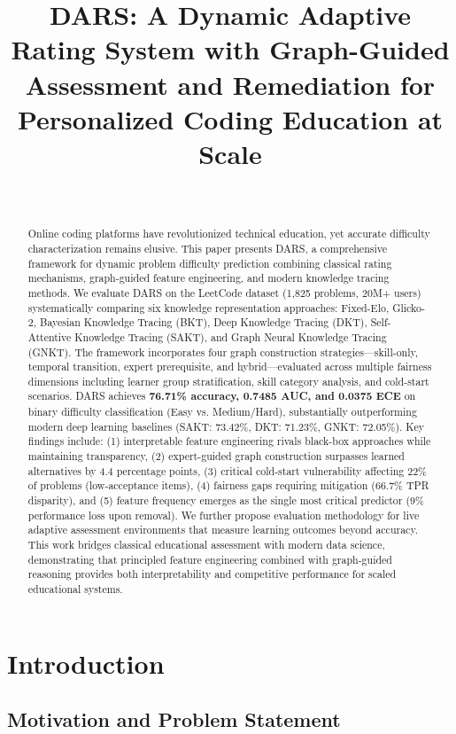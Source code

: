 \documentclass[conference]{IEEEtran}
\title{DARS: A Dynamic Adaptive Rating System with Graph-Guided Assessment and Remediation for Personalized Coding Education at Scale}
\author{\IEEEauthorblockN{Khethavath Sunil Naik}\\
\IEEEauthorblockA{Computer Science Department\\
Integrated BTech Research Initiative}}
\begin{document}
\maketitle

\begin{abstract}
Online coding platforms have revolutionized technical education, yet accurate difficulty characterization remains elusive. This paper presents DARS, a comprehensive framework for dynamic problem difficulty prediction combining classical rating mechanisms, graph-guided feature engineering, and modern knowledge tracing methods. We evaluate DARS on the LeetCode dataset (1,825 problems, 20M+ users) systematically comparing six knowledge representation approaches: Fixed-Elo, Glicko-2, Bayesian Knowledge Tracing (BKT), Deep Knowledge Tracing (DKT), Self-Attentive Knowledge Tracing (SAKT), and Graph Neural Knowledge Tracing (GNKT). The framework incorporates four graph construction strategies—skill-only, temporal transition, expert prerequisite, and hybrid—evaluated across multiple fairness dimensions including learner group stratification, skill category analysis, and cold-start scenarios. DARS achieves \textbf{76.71\% accuracy, 0.7485 AUC, and 0.0375 ECE} on binary difficulty classification (Easy vs. Medium/Hard), substantially outperforming modern deep learning baselines (SAKT: 73.42\%, DKT: 71.23\%, GNKT: 72.05\%). Key findings include: (1) interpretable feature engineering rivals black-box approaches while maintaining transparency, (2) expert-guided graph construction surpasses learned alternatives by 4.4 percentage points, (3) critical cold-start vulnerability affecting 22\% of problems (low-acceptance items), (4) fairness gaps requiring mitigation (66.7\% TPR disparity), and (5) feature frequency emerges as the single most critical predictor (9\% performance loss upon removal). We further propose evaluation methodology for live adaptive assessment environments that measure learning outcomes beyond accuracy. This work bridges classical educational assessment with modern data science, demonstrating that principled feature engineering combined with graph-guided reasoning provides both interpretability and competitive performance for scaled educational systems.
\end{abstract}

\section{Introduction}

\subsection{Motivation and Problem Statement}
\end{document}

